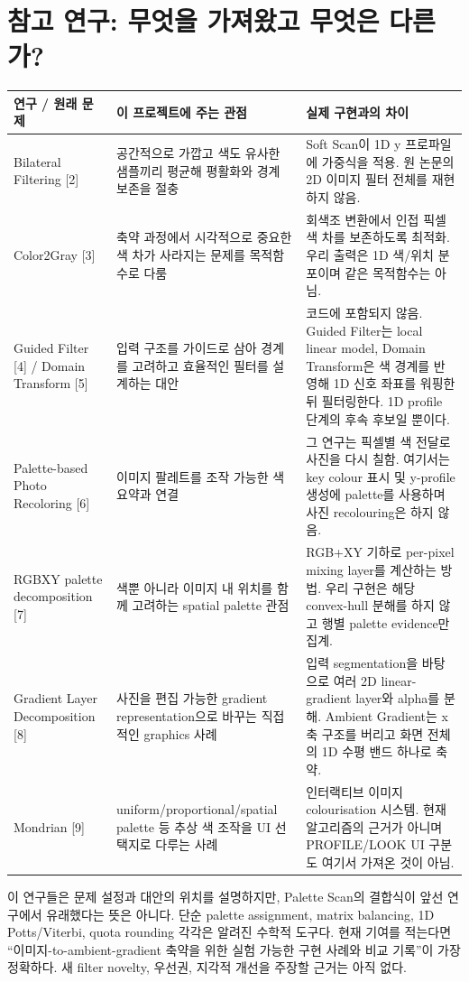 \documentclass[10pt]{article}
\begin{document}
\section{참고 연구: 무엇을 가져왔고 무엇은 다른가?}
\begin{tabularx}{\linewidth}{@{}p{3.5cm}YY@{}}
\toprule
연구 / 원래 문제 & 이 프로젝트에 주는 관점 & 실제 구현과의 차이 \\
\midrule
Bilateral Filtering [2] & 공간적으로 가깝고 색도 유사한 샘플끼리 평균해 평활화와 경계 보존을 절충 & Soft Scan이 1D y 프로파일에 가중식을 적용. 원 논문의 2D 이미지 필터 전체를 재현하지 않음. \\
Color2Gray [3] & 축약 과정에서 시각적으로 중요한 색 차가 사라지는 문제를 목적함수로 다룸 & 회색조 변환에서 인접 픽셀 색 차를 보존하도록 최적화. 우리 출력은 1D 색/위치 분포이며 같은 목적함수는 아님. \\
Guided Filter [4] / Domain Transform [5] & 입력 구조를 가이드로 삼아 경계를 고려하고 효율적인 필터를 설계하는 대안 & 코드에 포함되지 않음. Guided Filter는 local linear model, Domain Transform은 색 경계를 반영해 1D 신호 좌표를 워핑한 뒤 필터링한다. 1D profile 단계의 후속 후보일 뿐이다. \\
Palette-based Photo Recoloring [6] & 이미지 팔레트를 조작 가능한 색 요약과 연결 & 그 연구는 픽셀별 색 전달로 사진을 다시 칠함. 여기서는 key colour 표시 및 y-profile 생성에 palette를 사용하며 사진 recolouring은 하지 않음. \\
RGBXY palette decomposition [7] & 색뿐 아니라 이미지 내 위치를 함께 고려하는 spatial palette 관점 & RGB+XY 기하로 per-pixel mixing layer를 계산하는 방법. 우리 구현은 해당 convex-hull 분해를 하지 않고 행별 palette evidence만 집계. \\
Gradient Layer Decomposition [8] & 사진을 편집 가능한 gradient representation으로 바꾸는 직접적인 graphics 사례 & 입력 segmentation을 바탕으로 여러 2D linear-gradient layer와 alpha를 분해. Ambient Gradient는 x축 구조를 버리고 화면 전체의 1D 수평 밴드 하나로 축약. \\
Mondrian [9] & uniform/proportional/spatial palette 등 추상 색 조작을 UI 선택지로 다루는 사례 & 인터랙티브 이미지 colourisation 시스템. 현재 알고리즘의 근거가 아니며 PROFILE/LOOK UI 구분도 여기서 가져온 것이 아님. \\
\bottomrule
\end{tabularx}

이 연구들은 문제 설정과 대안의 위치를 설명하지만, Palette Scan의 결합식이 앞선 연구에서 유래했다는 뜻은 아니다. 단순 palette assignment, matrix balancing, 1D Potts/Viterbi, quota rounding 각각은 알려진 수학적 도구다. 현재 기여를 적는다면 “이미지-to-ambient-gradient 축약을 위한 실험 가능한 구현 사례와 비교 기록”이 가장 정확하다. 새 filter novelty, 우선권, 지각적 개선을 주장할 근거는 아직 없다.
\end{document}
